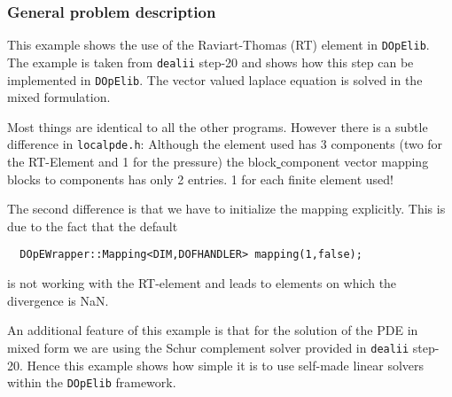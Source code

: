 \subsubsection{General problem description}
This example shows the use of the Raviart-Thomas (RT) element in \texttt{DOpElib}. The example 
is taken from \texttt{dealii} step-20 and shows how this step can be implemented in \texttt{DOpElib}. The vector valued laplace equation is solved in the mixed formulation.

Most things are identical to all the other programs. However there is a subtle difference in 
\texttt{localpde.h}: Although the element used has 3 components (two for the RT-Element and 1 for the pressure)
the block\underline{ }component vector mapping blocks to components has only 2 entries. 1 for each finite element used!

The second difference is that we have to initialize the mapping explicitly. This is due to the fact that the 
default 
\begin{verbatim}
  DOpEWrapper::Mapping<DIM,DOFHANDLER> mapping(1,false);
\end{verbatim}
is not working with the RT-element and leads to elements on which the divergence is NaN.

An additional feature of this example is that for the solution of the PDE in mixed form we are using the 
Schur complement solver provided in \texttt{dealii} step-20. Hence this example shows how simple it is to 
use self-made linear solvers within the \texttt{DOpElib} framework.